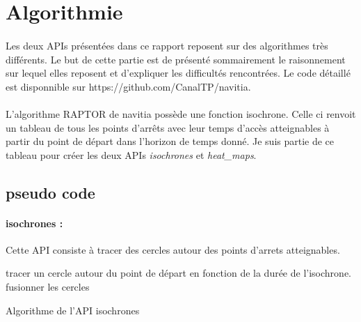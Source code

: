 \documentclass[a4paper]{report}
\begin{document}
\section{Algorithmie}

\paragraph{} Les deux APIs présentées dans ce rapport reposent sur des algorithmes très différents. Le but de cette partie est de présenté sommairement le raisonnement sur lequel elles reposent et d'expliquer les difficultés rencontrées. Le code détaillé est disponnible sur \color{blue} https://github.com/CanalTP/navitia.  
 \color{blue}

\color{black}
\paragraph{}L'algorithme RAPTOR de navitia possède une fonction isochrone. Celle ci renvoit un tableau de tous les points d'arrêts avec leur temps d'accès atteignables à partir du point de départ dans l'horizon de temps donné. Je suis partie de ce tableau pour créer les deux APIs \emph{isochrones} et \emph{heat\_maps}.

\subsection{pseudo code}

\paragraph{isochrones :} Cette API consiste à tracer des cercles autour des points d'arrets atteignables.
\newline

\begin{algorithm}[H]
 tracer un cercle autour du point de départ en fonction de la durée de l'isochrone.
 fusionner les cercles\
 \caption{Algorithme de l'API isochrones}
\end{algorithm}
\end{document}
